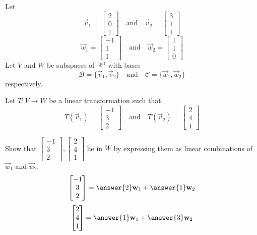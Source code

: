 \documentclass{ximera}
\begin{document}
\begin{problem}
Let $$\vec{v}_1=\begin{bmatrix}2\\0\\1\end{bmatrix}\quad\text{and}\quad\vec{v}_2=\begin{bmatrix}3\\1\\1\end{bmatrix}$$
$$\vec{w}_1=\begin{bmatrix}-1\\1\\1\end{bmatrix}\quad\text{and}\quad\vec{w}_2=\begin{bmatrix}1\\1\\0\end{bmatrix}$$
Let $V$ and $W$ be subspaces of $\mathbb{R}^3$ with bases $$\mathcal{B}=\{\vec{v}_1, \vec{v}_2\}\quad\text{and}\quad\mathcal{C}=\{\vec{w}_1, \vec{w}_2\}$$
respectively.

Let $T:V\rightarrow W$ be a linear transformation such that 
$$T(\vec{v}_1)=\begin{bmatrix}-1\\3\\2\end{bmatrix}\quad\text{and}\quad T(\vec{v}_2)=\begin{bmatrix}2\\4\\1\end{bmatrix}$$

	\begin{problem}\label{prob:matlintransabstract2}
    Show that $\begin{bmatrix}-1\\3\\2\end{bmatrix}, \begin{bmatrix}2\\4\\1\end{bmatrix}$ lie in $W$ by expressing them as linear combinations of $\vec{w}_1$ and $\vec{w}_2$.
     $$\begin{bmatrix}-1\\3\\2\end{bmatrix}=\answer{2}\vec{w}_1+\answer{1}\vec{w}_2$$
    $$\begin{bmatrix}2\\4\\1\end{bmatrix}=\answer{1}\vec{w}_1+\answer{3}\vec{w}_2$$
    \end{problem}


\end{problem}
\end{document}
